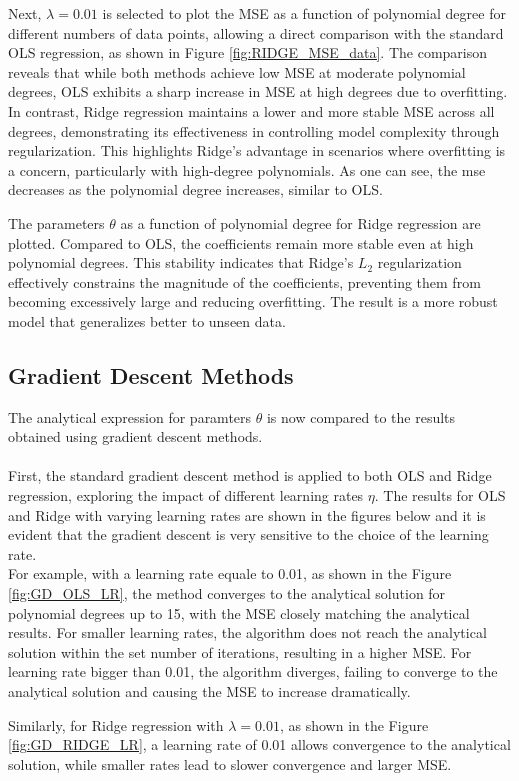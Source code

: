 \documentclass[
 reprint,            %
 amsmath,amssymb,
 aps,
]{revtex4-2}
\begin{document}


Next, $\lambda = 0.01$ is selected to plot the MSE as a function of polynomial degree for different numbers of data points, allowing a direct comparison with the standard OLS regression, as shown in Figure \ref{fig:RIDGE_MSE_data}. 
The comparison reveals that while both methods achieve low MSE at moderate polynomial degrees, OLS exhibits a sharp increase in MSE at high degrees due to overfitting. In contrast, Ridge regression maintains a lower and more stable MSE across all degrees, demonstrating its effectiveness in controlling model complexity through regularization. This highlights Ridge's advantage in scenarios where overfitting is a concern, particularly with high-degree polynomials.
As one can see, the mse decreases as the polynomial degree increases, similar to OLS.


The parameters $\theta$ as a function of polynomial degree for Ridge regression are plotted. Compared to OLS, the coefficients remain more stable even at high polynomial degrees. 
This stability indicates that Ridge's $L_2$ regularization effectively constrains the magnitude of the coefficients, preventing them from becoming excessively large and reducing overfitting.
The result is a more robust model that generalizes better to unseen data.

\subsection{Gradient Descent Methods}
\label{Gradient Descent Methods}

The analytical expression for paramters $\theta$ is now compared to the results obtained using gradient descent methods.\\\\
First, the standard gradient descent method is applied to both OLS and Ridge regression, exploring the impact of different learning rates $\eta$. 
The results for OLS and Ridge with varying learning rates are shown in the figures below and it is evident that the gradient descent is very sensitive to the choice of the learning rate.\\
For example, with a learning rate equale to 0.01, as shown in the Figure \ref{fig:GD_OLS_LR}, the method converges to the analytical solution for polynomial degrees up to 15, with the MSE closely matching the analytical results.
For smaller learning rates, the algorithm does not reach the analytical solution within the set number of iterations, resulting in a higher MSE. 
For learning rate bigger than 0.01, the algorithm diverges, failing to converge to the analytical solution and causing the MSE to increase dramatically.

Similarly, for Ridge regression with $\lambda = 0.01$, as shown in the Figure \ref{fig:GD_RIDGE_LR}, a learning rate of 0.01 allows convergence to the analytical solution, while smaller rates lead to slower convergence and larger MSE.

 
\end{document}
